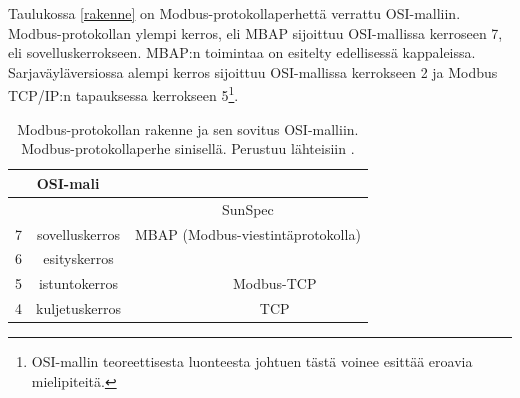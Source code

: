    Taulukossa \ref{rakenne} on Modbus-protokollaperhettä verrattu \gls{OSI}-malliin. Modbus-protokollan ylempi kerros, eli \gls{MBAP} sijoittuu \gls{OSI}-mallissa kerroseen 7, eli sovelluskerrokseen. \gls{MBAP}:n toimintaa on esitelty edellisessä kappaleissa. Sarjaväyläversiossa alempi kerros sijoittuu \gls{OSI}-mallissa kerrokseen 2 ja Modbus TCP/IP:n tapauksessa kerrokseen 5\footnote{\gls{OSI}-mallin teoreettisesta luonteesta johtuen tästä voinee esittää eroavia mielipiteitä.}.
    \begin{table}
      \centering
      \caption[Modbus-protokollan rakenne ja \gls{OSI}-malli]{Modbus-protokollan rakenne ja sen sovitus \gls{OSI}-malliin. Modbus-protokollaperhe sinisellä. Perustuu lähteisiin \parencite{osi, modbusSerialSpec, modbusTCPIPSpec}.}
      \begin{tabular}{|c|c|ccc}
        \cline{1-2}
        \multicolumn{2}{|c|}{OSI-mali}                                               & \multicolumn{3}{c}{}                                                                                                                                                                           \\ \hline
        \multicolumn{1}{|l|}{}                    &                                  & \multicolumn{3}{c|}{\cellcolor{yellow}SunSpec}                                                                                                                                                 \\ \cline{3-5}
        \multicolumn{1}{|l|}{7}                   & sovelluskerros                   & \multicolumn{3}{c|}{\cellcolor{blue}MBAP (Modbus-viestintäprotokolla)}                                                                                                                         \\ \hline
        6                                         & esityskerros                     &                                                         &                                                           & \multicolumn{1}{c|}{}                                                    \\ \cline{1-2} \cline{5-5}
        5                                         & istuntokerros                    &                                                         & \multicolumn{1}{c|}{}                                     & \multicolumn{1}{c|}{\cellcolor{blue}Modbus-\gls{TCP}}                    \\ \cline{1-2} \cline{5-5}
        4                                         & kuljetuskerros                   &                                                         & \multicolumn{1}{c|}{}                                     & \multicolumn{1}{c|}{\gls{TCP}}                                           \\ \cline{1-2} \cline{5-5}

\end{tabular}
\end{table}
